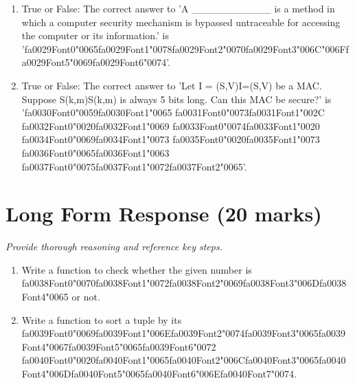 \documentclass[12pt]{article}
\begin{document}
\begin{enumerate}[label=\arabic*.]
\item True or False: The correct answer to 'A \_\_\_\_\_\_\_\_\_\_\_ is a method in which a computer security mechanism is bypassed untraceable for accessing the computer or its information.' is '{\csname fa0029Font0\endcsname\char"0065}{\csname fa0029Font1\endcsname\char"0078}{\csname fa0029Font2\endcsname\char"0070}{\csname fa0029Font3\endcsname\char"006C}{\char"006F}{\csname fa0029Font5\endcsname\char"0069}{\csname fa0029Font6\endcsname\char"0074}'.
\item True or False: The correct answer to 'Let I = (S,V)I=(S,V) be a MAC. Suppose S(k,m)S(k,m) is always 5 bits long. Can this MAC be secure?' is '{\csname fa0030Font0\endcsname\char"0059}{\csname fa0030Font1\endcsname\char"0065} {\csname fa0031Font0\endcsname\char"0073}{\csname fa0031Font1\endcsname\char"002C} {\csname fa0032Font0\endcsname\char"0020}{\csname fa0032Font1\endcsname\char"0069} {\csname fa0033Font0\endcsname\char"0074}{\csname fa0033Font1\endcsname\char"0020} {\csname fa0034Font0\endcsname\char"0069}{\csname fa0034Font1\endcsname\char"0073} {\csname fa0035Font0\endcsname\char"0020}{\csname fa0035Font1\endcsname\char"0073} {\csname fa0036Font0\endcsname\char"0065}{\csname fa0036Font1\endcsname\char"0063} {\csname fa0037Font0\endcsname\char"0075}{\csname fa0037Font1\endcsname\char"0072}{\csname fa0037Font2\endcsname\char"0065}'.
\end{enumerate}

\section*{Long Form Response (20 marks)}
\textit{Provide thorough reasoning and reference key steps.}
\begin{enumerate}[label=\arabic*.]
\item Write a function to check whether the given number is {\csname fa0038Font0\endcsname\char"0070}{\csname fa0038Font1\endcsname\char"0072}{\csname fa0038Font2\endcsname\char"0069}{\csname fa0038Font3\endcsname\char"006D}{\csname fa0038Font4\endcsname\char"0065} or not.
\item Write a function to sort a tuple by its {\csname fa0039Font0\endcsname\char"0069}{\csname fa0039Font1\endcsname\char"006E}{\csname fa0039Font2\endcsname\char"0074}{\csname fa0039Font3\endcsname\char"0065}{\csname fa0039Font4\endcsname\char"0067}{\csname fa0039Font5\endcsname\char"0065}{\csname fa0039Font6\endcsname\char"0072} {\csname fa0040Font0\endcsname\char"0020}{\csname fa0040Font1\endcsname\char"0065}{\csname fa0040Font2\endcsname\char"006C}{\csname fa0040Font3\endcsname\char"0065}{\csname fa0040Font4\endcsname\char"006D}{\csname fa0040Font5\endcsname\char"0065}{\csname fa0040Font6\endcsname\char"006E}{\csname fa0040Font7\endcsname\char"0074}.
\end{enumerate}
\end{document}
